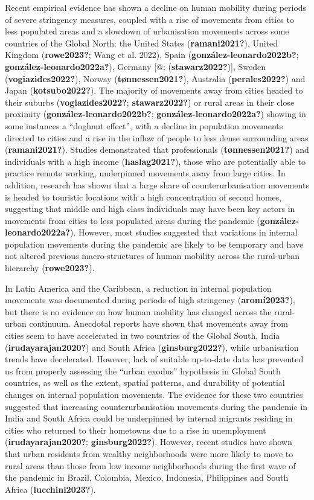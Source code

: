 \documentclass[11pt,letterpaper]{article}
\begin{document}
Recent empirical evidence has shown a decline on human mobility during
periods of severe stringency measures, coupled with a rise of movements
from cities to less populated areas and a slowdown of urbanisation
movements across some countries of the Global North: the United States
(\textbf{ramani2021?}), United Kingdom (\textbf{rowe2023?}; Wang et al.
2022), Spain (\textbf{gonzález-leonardo2022b?};
\textbf{gonzález-leonardo2022a?}), Germany {[}@;
(\textbf{stawarz2022?}){]}, Sweden (\textbf{vogiazides2022?}), Norway
(\textbf{tønnessen2021?}), Australia (\textbf{perales2022?}) and Japan
(\textbf{kotsubo2022?}). The majority of movements away from cities
headed to their suburbs (\textbf{vogiazides2022?};
\textbf{stawarz2022?}) or rural areas in their close proximity
(\textbf{gonzález-leonardo2022b?}; \textbf{gonzález-leonardo2022a?})
showing in some instances a ``doghnut effect'', with a decline in
population movements directed to cities and a rise in the inflow of
people to less dense surrounding areas (\textbf{ramani2021?}). Studies
demonstrated that professionals (\textbf{tønnessen2021?}) and
individuals with a high income (\textbf{haslag2021?}), those who are
potentially able to practice remote working, underpinned movements away
from large cities. In addition, research has shown that a large share of
counterurbanisation movements is headed to touristic locations with a
high concentration of second homes, suggesting that middle and high
class individuals may have been key actors in movements from cities to
less populated areas during the pandemic
(\textbf{gonzález-leonardo2022a?}). However, most studies suggested that
variations in internal population movements during the pandemic are
likely to be temporary and have not altered previous macro-structures of
human mobility across the rural-urban hierarchy (\textbf{rowe2023?}).

In Latin America and the Caribbean, a reduction in internal population
movements was documented during periods of high stringency
(\textbf{aromí2023?}), but there is no evidence on how human mobility
has changed across the rural-urban continuum. Anecdotal reports have
shown that movements away from cities seem to have accelerated in two
countries of the Global South, India (\textbf{irudayarajan2020?}) and
South Africa (\textbf{ginsburg2022?}), while urbanisation trends have
decelerated. However, lack of suitable up-to-date data has prevented us
from properly assessing the ``urban exodus'' hypothesis in Global South
countries, as well as the extent, spatial patterns, and durability of
potential changes on internal population movements. The evidence for
these two countries suggested that increasing counterurbanisation
movements during the pandemic in India and South Africa could be
underpinned by internal migrants residing in cities who returned to
their hometowns due to a rise in unemployment
(\textbf{irudayarajan2020?}; \textbf{ginsburg2022?}). However, recent
studies have shown that urban residents from wealthy neighborhoods were
more likely to move to rural areas than those from low income
neighborhoods during the first wave of the pandemic in Brazil, Colombia,
Mexico, Indonesia, Philippines and South Africa
(\textbf{lucchini2023?}).
\end{document}
